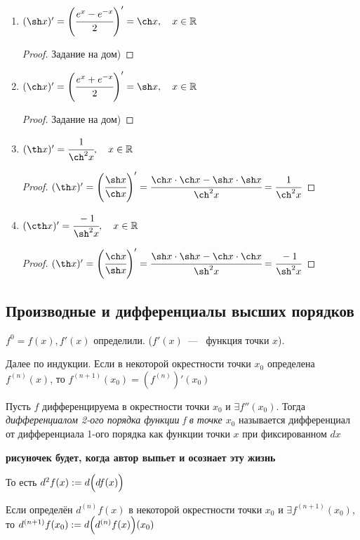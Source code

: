 \begin{corollary}
\begin{enumerate}
        \item $(\sh x)' = \left(\cfrac{e^{x} - e^{-x}}{2}\right)' = \ch x, \quad x\in \R $
        \begin{proof}
            Задание на дом)
        \end{proof}
        \item $(\ch x)' = \left(\cfrac{e^{x} + e^{-x}}{2}\right)' = \sh x, \quad x \in \R $
        \begin{proof}
            Задание на дом)
        \end{proof}
        \item $(\th x)' = \cfrac{1}{\ch^{2} x}, \quad x \in \R $
        \begin{proof}
            $(\th x)' =\left(\cfrac{\sh x}{\ch x}\right)' = \cfrac{\ch x \cdot \ch x - \sh x \cdot \sh x}{\ch^{2} x} = \cfrac{1}{\ch^{2} x} $
        \end{proof}
        \item $(\cth x)' = \cfrac{-1}{\sh^{2} x}, \quad x \in \R $
        \begin{proof}
            $(\th x)' =\left(\cfrac{\ch x}{\sh x}\right)' = \cfrac{\sh x \cdot \sh x - \ch x \cdot \ch x}{\sh^{2} x} = \cfrac{-1}{\sh^{2} x} $
        \end{proof}
    \end{enumerate}
\end{corollary}

\subsection{Производные и дифференциалы высших порядков}
\begin{definition}
    $f^{0} = f(x), f'(x)$ определили. ($f'(x)$~---~ функция точки $x$).

    Далее по индукции. Если в некоторой окрестности точки $x_{0}$ определена $f^{(n)}(x)$, то $f^{(n+1)} (x_{0}) = \left(f^{(n)}\right)'(x_{0})$
\end{definition}

\begin{definition}
    Пусть $f$ дифференцируема в окрестности точки $x_{0}$ и $\exists f''(x_{0})$. Тогда \textit{дифференциалом 2-ого порядка функции f в точке $x_{0}$} называется дифференциал от дифференциала 1-ого порядка как функции точки $x$ при фиксированном $dx$

    \textbf{рисуночек будет, когда автор выпьет и осознает эту жизнь}
    
    То есть $d^2 f(x) := d\Bigl(df(x)\Bigr)$
\end{definition}
\begin{definition}
    Если определён $d^{(n)}f(x)$ в некоторой окрестности точки $x_{0}$ и $\exists f^{(n+1)}(x_{0})$, то $d^{(n+1)} f(x_{0}) :=  d\Bigl(d^{(n)}f(x)\Bigr)(x_{0})$
\end{definition}

